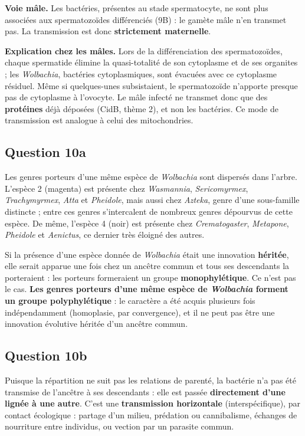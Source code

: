 \documentclass[11pt,a4paper]{article}
\begin{document}
\textbf{Voie mâle.} Les bactéries, présentes au stade spermatocyte, ne sont plus associées aux spermatozoïdes différenciés (9B) : le gamète mâle n'en transmet pas. La transmission est donc \textbf{strictement maternelle}.

\textbf{Explication chez les mâles.} Lors de la différenciation des spermatozoïdes, chaque spermatide élimine la quasi-totalité de son cytoplasme et de ses organites ; les \emph{Wolbachia}, bactéries cytoplasmiques, sont évacuées avec ce cytoplasme résiduel. Même si quelques-unes subsistaient, le spermatozoïde n'apporte presque pas de cytoplasme à l'ovocyte. Le mâle infecté ne transmet donc que des \textbf{protéines} déjà déposées (CidB, thème 2), et non les bactéries. Ce mode de transmission est analogue à celui des mitochondries.

\hypertarget{question-10a}{%
\subsection{Question 10a}\label{question-10a}}

Les genres porteurs d'une même espèce de \emph{Wolbachia} sont dispersés dans l'arbre. L'espèce 2 (magenta) est présente chez \emph{Wasmannia}, \emph{Sericomyrmex}, \emph{Trachymyrmex}, \emph{Atta} et \emph{Pheidole}, mais aussi chez \emph{Azteka}, genre d'une sous-famille distincte ; entre ces genres s'intercalent de nombreux genres dépourvus de cette espèce. De même, l'espèce 4 (noir) est présente chez \emph{Crematogaster}, \emph{Metapone}, \emph{Pheidole} et \emph{Aenictus}, ce dernier très éloigné des autres.

Si la présence d'une espèce donnée de \emph{Wolbachia} était une innovation \textbf{héritée}, elle serait apparue une fois chez un ancêtre commun et tous ses descendants la porteraient : les porteurs formeraient un groupe \textbf{monophylétique}. Ce n'est pas le cas. \textbf{Les genres porteurs d'une même espèce de \emph{Wolbachia} forment un groupe polyphylétique} : le caractère a été acquis plusieurs fois indépendamment (homoplasie, par convergence), et il ne peut pas être une innovation évolutive héritée d'un ancêtre commun.

\hypertarget{question-10b}{%
\subsection{Question 10b}\label{question-10b}}

Puisque la répartition ne suit pas les relations de parenté, la bactérie n'a pas été transmise de l'ancêtre à ses descendants : elle est passée \textbf{directement d'une lignée à une autre}. C'est une \textbf{transmission horizontale} (interspécifique), par contact écologique : partage d'un milieu, prédation ou cannibalisme, échanges de nourriture entre individus, ou vection par un parasite commun.
\end{document}
